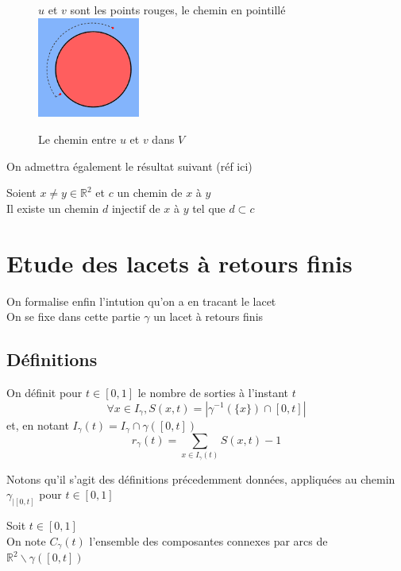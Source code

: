 \documentclass{article}
\begin{document}
\begin{flushleft}
\begin{figure}[h]
    \caption{Le chemin entre $u$ et $v$ dans $V$}
    \centering
    $u$ et $v$ sont les points rouges, le chemin en pointillé\\
    \includegraphics[width = 0.3\textwidth]{Chemin radial.png}
\end{figure}

On admettra également le résultat suivant (réf ici)

\begin{tcolorbox}[colback = purple!20!white, colframe = purple!60!white, title = Théorème 1]
    Soient $x \neq y \in \mathbb{R}^2$ et $c$ un chemin de $x$ à $y$\\
    Il existe un chemin $d$ injectif de $x$ à $y$ tel que $d \subset c$
\end{tcolorbox}

\section{Etude des lacets à retours finis}

On formalise enfin l'intution qu'on a en tracant le lacet\\
On se fixe dans cette partie $\gamma$ un lacet à retours finis

\subsection{Définitions}

\begin{tcolorbox}[colback = yellow!60!white, colframe = orange!90!white, title = Définition 4]
    On définit pour $t \in [0, 1]$ le nombre de sorties à l'instant $t$
    \[\forall x \in I_{\gamma}, S(x, t) = |\gamma^{-1}(\{x\}) \cap [0, t]|\]
    et, en notant $I_{\gamma}(t) = I_{\gamma} \cap \gamma([0, t])$
    \[r_{\gamma}(t) = \sum_{x \in I_{\gamma}(t)} S(x ,t) - 1\]
\end{tcolorbox}
\vspace{0.5cm}
Notons qu'il s'agit des définitions précedemment données, appliquées au chemin $\gamma_{\mid[0, t]}$ pour $t \in [0, 1]$
\vspace{0.5cm}
\begin{tcolorbox}[colback = yellow!60!white, colframe = orange!90!white, title = Définition 5]
    Soit $t \in [0, 1]$\\
    On note $C_{\gamma}(t)$ l'ensemble des composantes connexes par arcs de
    $\mathbb{R}^2 \backslash \gamma([0, t])$
\end{tcolorbox}


\end{flushleft}
\end{document}
